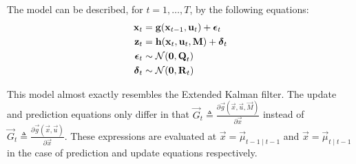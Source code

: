 The model can be described, for $t = 1, \dotsc, T$, by the following equations:
\begin{align}
	\boldsymbol{\mathbf{x}}_t 			&= \boldsymbol{\mathbf{g}}(\boldsymbol{\mathbf{x}}_{t - 1}, \boldsymbol{\mathbf{u}}_t) + \boldsymbol{\mathbf{\epsilon}}_t \\
	\boldsymbol{\mathbf{z}}_t 			&= \boldsymbol{\mathbf{h}}(\boldsymbol{\mathbf{x}}_t, \boldsymbol{\mathbf{u}}_t, \boldsymbol{\mathbf{M}}) + \boldsymbol{\mathbf{\delta}}_t \\
	\boldsymbol{\mathbf{\epsilon}}_t 	&\sim \operatorname{\mathcal N}(\boldsymbol{\mathbf{0}}, \boldsymbol{\mathbf{Q}}_t) \\
	\boldsymbol{\mathbf{\delta}}_t		&\sim \operatorname{\mathcal N}(\boldsymbol{\mathbf{0}}, \boldsymbol{\mathbf{R}}_t)
\end{align}

This model almost exactly resembles the Extended Kalman filter. The update and prediction equations only differ in that
$\vec G_t \triangleq \frac{\partial \vec g(\vec x, \vec u, \vec M)}{\partial \vec x}$ instead of $\vec G_t \triangleq \frac{\partial \vec g(\vec x, \vec u)}{\partial \vec x}$. These expressions are evaluated at $\vec x = \vec \mu_{t - 1 \mid t - 1}$ and $\vec x = \vec \mu_{t \mid t - 1}$ in the case of prediction and update equations respectively.